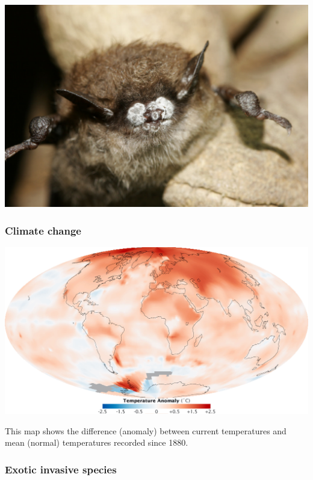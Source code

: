 \documentclass[
]{article}
\begin{document}
\includegraphics{whitenose1.jpg}

\hypertarget{climate-change}{%
\subsubsection{Climate change}\label{climate-change}}

\includegraphics{climatechange1.jpg}

This map shows the difference (anomaly) between current temperatures and
mean (normal) temperatures recorded since 1880.

\hypertarget{exotic-invasive-species}{%
\subsubsection{Exotic invasive species}\label{exotic-invasive-species}}
\end{document}
